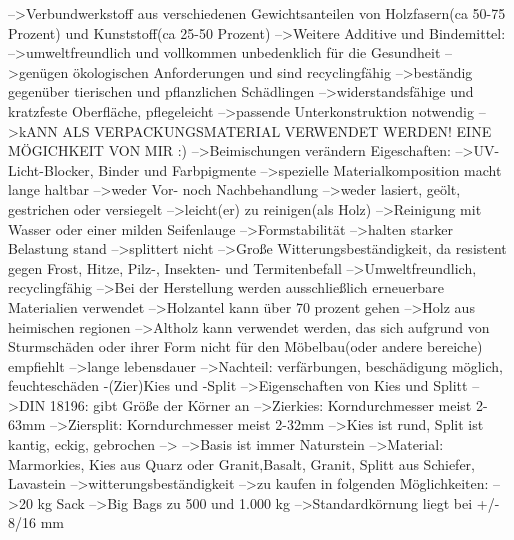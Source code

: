                         -->Verbundwerkstoff aus verschiedenen Gewichtsanteilen von Holzfasern(ca 50-75 Prozent) und Kunststoff(ca 25-50 Prozent)
                        -->Weitere Additive und Bindemittel:
                            -->umweltfreundlich und vollkommen unbedenklich für die Gesundheit
                            -->genügen ökologischen Anforderungen und sind recyclingfähig
                        -->beständig gegenüber tierischen und pflanzlichen Schädlingen
                        -->widerstandsfähige und kratzfeste Oberfläche, pflegeleicht
                        -->passende Unterkonstruktion notwendig
                        -->kANN ALS VERPACKUNGSMATERIAL VERWENDET WERDEN! EINE MÖGICHKEIT VON MIR :)
                            -->Beimischungen verändern Eigeschaften: 
                                -->UV-Licht-Blocker, Binder und Farbpigmente
                                -->spezielle Materialkomposition macht lange haltbar
                                -->weder Vor- noch Nachbehandlung
                                    -->weder lasiert, geölt, gestrichen oder versiegelt
                                -->leicht(er) zu reinigen(als Holz)
                                    -->Reinigung mit Wasser oder einer milden Seifenlauge
                                -->Formstabilität
                                    -->halten starker Belastung stand
                                    -->splittert nicht
                                -->Große Witterungsbeständigkeit, da resistent gegen         Frost, Hitze, Pilz-, Insekten- und Termitenbefall
                                -->Umweltfreundlich, recyclingfähig
                                -->Bei der Herstellung werden ausschließlich erneuerbare Materialien verwendet
                                -->Holzantel kann über 70 prozent gehen
                                    -->Holz aus heimischen regionen
                                -->Altholz kann verwendet werden, das sich aufgrund von Sturmschäden oder ihrer Form nicht für den Möbelbau(oder andere bereiche) empfiehlt
                                -->lange lebensdauer
                                -->Nachteil: verfärbungen, beschädigung möglich, feuchteschäden
                    -(Zier)Kies und -Split
                        -->Eigenschaften von Kies und Splitt
                            -->DIN 18196: gibt Größe der Körner an
                                -->Zierkies: Korndurchmesser meist 2-63mm
                                -->Ziersplit: Korndurchmesser meist 2-32mm
                        -->Kies ist rund, Split ist kantig, eckig, gebrochen
                                -->%
                        -->Basis ist immer Naturstein
                        -->Material: Marmorkies, Kies aus Quarz oder Granit,Basalt,         Granit, Splitt aus Schiefer, Lavastein 
                        -->witterungsbeständigkeit
                        -->zu kaufen in folgenden Möglichkeiten:
                            -->20 kg Sack
                            -->Big Bags zu 500 und 1.000 kg
                            -->Standardkörnung liegt bei +/- 8/16 mm
                            
